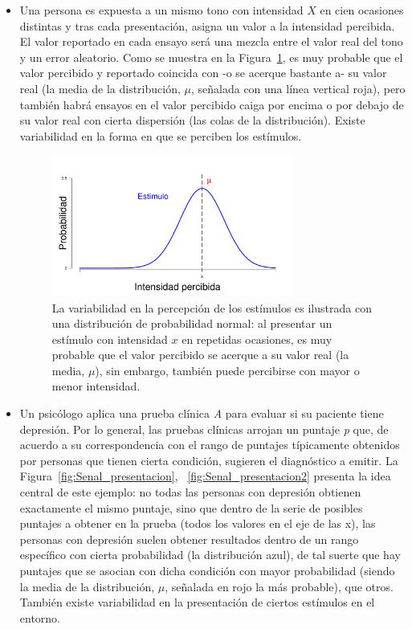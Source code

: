 \begin{itemize}
\item Una persona es expuesta a un mismo tono con intensidad $X$ en cien ocasiones distintas y tras cada presentación, asigna un valor a la intensidad percibida. El valor reportado en cada ensayo será una mezcla entre el valor real del tono y un error aleatorio. Como se muestra en la Figura~\ref{fig:Senal_percepcion}, es muy probable que el valor percibido y reportado coincida con -o se acerque bastante a- su valor real (la media de la distribución, $\mu$, señalada con una línea vertical roja), pero también habrá ensayos en el valor percibido caiga por encima o por debajo de su valor real con cierta dispersión (las colas de la distribución). Existe variabilidad en la forma en que se perciben los estímulos.\\

\begin{figure}[h]
\centering
\includegraphics[width=0.75\textwidth]{Figures/Signal_Perception} 
\caption[Variabilidad en la percepción de los estímulos]{La variabilidad en la percepción de los estímulos es ilustrada con una distribución de probabilidad normal: al presentar un estímulo con intensidad $x$ en repetidas ocasiones, es muy probable que el valor percibido se acerque a su valor real (la media, $\mu$), sin embargo, también puede percibirse con mayor o menor intensidad.}
\label{fig:Senal_percepcion}
\end{figure}

\item Un psicólogo aplica una prueba clínica \textit{A} para evaluar si su paciente tiene depresión. Por lo general, las pruebas clínicas arrojan un puntaje \textit{p} que, de acuerdo a su correspondencia con el rango de puntajes típicamente obtenidos por personas que tienen cierta condición, sugieren el diagnóstico a emitir. La Figura~\ref{fig:Senal_presentacion}, ~\ref{fig:Senal_presentacion2} presenta la idea central de este ejemplo: no todas las personas con depresión obtienen exactamente el mismo puntaje, sino que dentro de la serie de posibles puntajes a obtener en la prueba (todos los valores en el eje de las x), las personas con depresión suelen obtener resultados dentro de un rango específico con cierta probabilidad (la distribución azul), de tal suerte que hay puntajes que se asocian con dicha condición con mayor probabilidad (siendo la media de la distribución, $\mu$, señalada en rojo la más probable), que otros. También existe variabilidad en la presentación de ciertos estímulos en el entorno.\\
\end{itemize}

